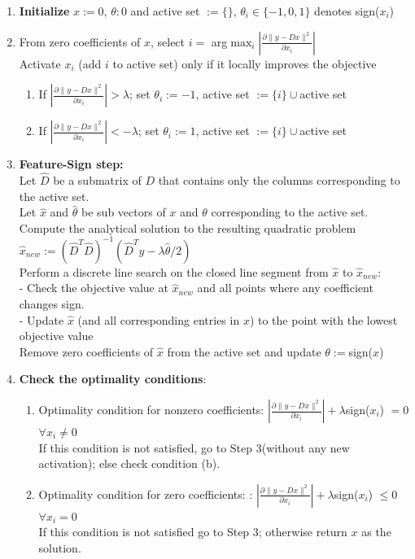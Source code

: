 \documentclass{article} %
\begin{document}
\begin{enumerate}
\item \textbf{Initialize} $x := 0$, $\theta : 0$ and active set $:= \{\}$, $\theta_i \in \{-1,0,1\}$ denotes sign($x_i$)
\item From zero coefficients of $x$, select $i = $ arg$\max_i |\frac{\partial\|y - Dx\|^2}{\partial x_i}|$\\
Activate $x_i$ (add $i$ to active set) only if it locally improves the objective
\begin{enumerate}
\item If $|\frac{\partial\|y - Dx\|^2}{\partial x_i}| > \lambda$; set $\theta_i := -1$, active set $:= \{i\} \cup$active set
\item If $|\frac{\partial\|y - Dx\|^2}{\partial x_i}| < -\lambda$; set $\theta_i := 1$, active set $:= \{i\} \cup$active set
\end{enumerate}
\item \textbf{Feature-Sign step:}\\
Let $\hat{D}$ be a submatrix of $D$ that contains only the columns corresponding to the active set.\\
Let $\hat{x}$ and $\hat{\theta}$ be sub vectors of $x$ and $\theta$ corresponding to the active set.\\
Compute the analytical solution to the resulting quadratic problem\\
$\hat{x}_{new} := (\hat{D}^T\hat{D})^{-1}(\hat{D}^Ty - \lambda \hat{\theta}/2)$\\
Perform a discrete line search on the closed line segment from $\hat{x}$ to $\hat{x}_{new}$:\\
- Check the objective value at $\hat{x}_{new}$ and all points where any coefficient changes sign.\\
- Update $\hat{x}$ (and all corresponding entries in $x$) to the point with the lowest objective value\\
Remove zero coefficients of $\hat{x}$ from the active set and update $\theta := $sign($x$)
\item \textbf{Check the optimality conditions}:
\begin{enumerate}
\item Optimality condition for nonzero coefficients: $|\frac{\partial\|y - Dx\|^2}{\partial x_i}| + \lambda$sign($x_i$) $=  0$ $\forall x_i \neq 0$\\
If this condition is not satisfied, go to Step 3(without any new activation); else check condition (b).
\item  Optimality condition for zero coefficients: : $|\frac{\partial\|y - Dx\|^2}{\partial x_i}| + \lambda$sign($x_i$) $\leq 0$ $\forall x_i = 0$\\
If this condition is not satisfied go to Step 3; otherwise return $x$ as the solution.
\end{enumerate} 
\end{enumerate}
\end{document}
